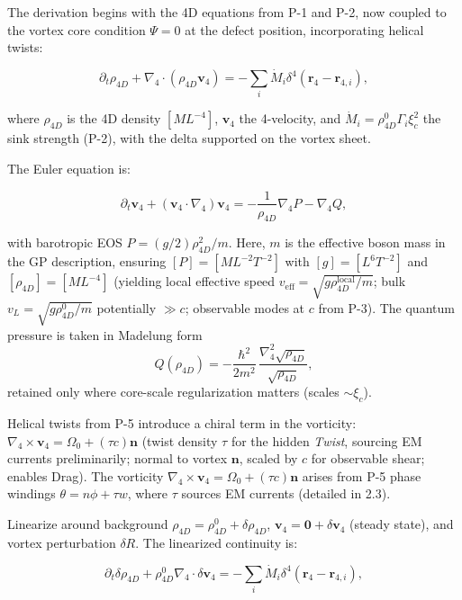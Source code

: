 The derivation begins with the 4D equations from P-1 and P-2, now coupled to the vortex core condition $\Psi=0$ at the defect position, incorporating helical twists:

\begin{equation}
\partial_t \rho_{4D} + \nabla_4 \cdot (\rho_{4D} \mathbf{v}_4) = -\sum_i \dot{M}_i \delta^4(\mathbf{r}_4 - \mathbf{r}_{4,i}),
\end{equation}

where $\rho_{4D}$ is the 4D density $[M L^{-4}]$, $\mathbf{v}_4$ the 4-velocity, and $\dot{M}_i = \rho_{4D}^0 \Gamma_i \xi_c^2$ the sink strength (P-2), with the delta supported on the vortex sheet.

The Euler equation is:

\begin{equation}
\partial_t \mathbf{v}_4 + (\mathbf{v}_4 \cdot \nabla_4) \mathbf{v}_4 = -\frac{1}{\rho_{4D}} \nabla_4 P - \nabla_4 Q,
\end{equation}

with barotropic EOS $P = (g/2) \rho_{4D}^2 / m$. Here, $m$ is the effective boson mass in the GP description, ensuring $[P] = [M L^{-2} T^{-2}]$ with $[g] = [L^6 T^{-2}]$ and $[\rho_{4D}] = [M L^{-4}]$ (yielding local effective speed $v_{\text{eff}} = \sqrt{g \rho_{4D}^{\text{local}} / m}$; bulk $v_L = \sqrt{g \rho_{4D}^0 / m}$ potentially $\gg c$; observable modes at $c$ from P-3). The quantum pressure is taken in Madelung form
\[
Q(\rho_{4D})=-\frac{\hbar^2}{2m^2}\,\frac{\nabla_4^2\sqrt{\rho_{4D}}}{\sqrt{\rho_{4D}}},
\]
retained only where core-scale regularization matters (scales $\sim\xi_c$).

Helical twists from P-5 introduce a chiral term in the vorticity: $\nabla_4 \times \mathbf{v}_4 = \Omega_0 + (\tau c) \mathbf{n}$ (twist density $\tau$ for the hidden \emph{Twist}, sourcing EM currents preliminarily; normal to vortex $\mathbf{n}$, scaled by $c$ for observable shear; enables Drag). The vorticity $\nabla_4 \times \mathbf{v}_4 = \Omega_0 + (\tau c) \mathbf{n}$ arises from P-5 phase windings $\theta = n\phi + \tau w$, where $\tau$ sources EM currents (detailed in 2.3).

Linearize around background $\rho_{4D} = \rho_{4D}^0 + \delta \rho_{4D}$, $\mathbf{v}_4 = \mathbf{0} + \delta \mathbf{v}_4$ (steady state), and vortex perturbation $\delta R$. The linearized continuity is:

\begin{equation}
\partial_t \delta \rho_{4D} + \rho_{4D}^0 \nabla_4 \cdot \delta \mathbf{v}_4 = -\sum_i \dot{M}_i \delta^4(\mathbf{r}_4 - \mathbf{r}_{4,i}),
\end{equation}

